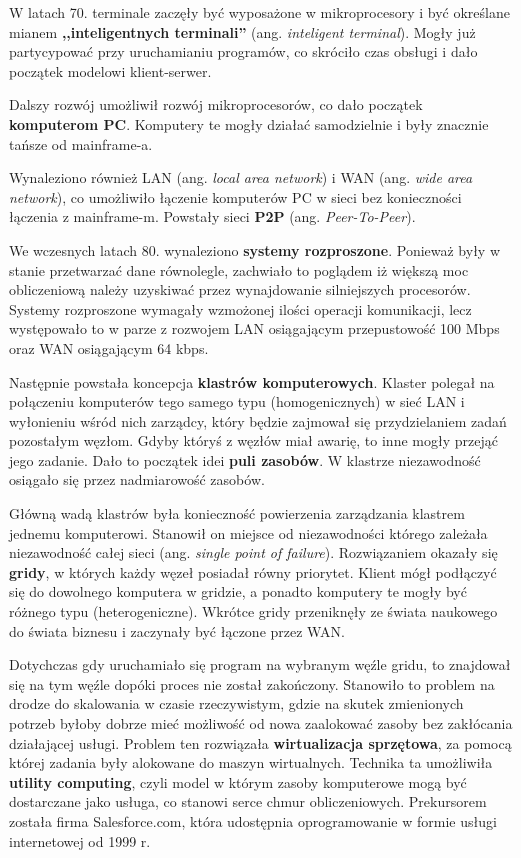 \documentclass[12pt,a4paper,twoside,titlepage,openright]{book}
\begin{document}
W latach 70. terminale zaczęły być wyposażone w mikroprocesory i być określane mianem \textbf{,,inteligentnych terminali''} (ang. \textit{inteligent terminal}). Mogły już partycypować przy uruchamianiu programów, co skróciło czas obsługi i dało początek modelowi klient-serwer.

Dalszy rozwój umożliwił rozwój mikroprocesorów, co dało początek \textbf{komputerom PC}. Komputery te mogły działać samodzielnie i były znacznie tańsze od mainframe-a.

Wynaleziono również LAN (ang. \textit{local area network}) i WAN (ang. \textit{wide area network}), co umożliwiło łączenie komputerów PC w sieci bez konieczności łączenia z mainframe-m. Powstały sieci \textbf{P2P} (ang. \textit{Peer-To-Peer}).

We wczesnych latach 80. wynaleziono \textbf{systemy rozproszone}. Ponieważ były w stanie przetwarzać dane równolegle, zachwiało to poglądem iż większą moc obliczeniową należy uzyskiwać przez wynajdowanie silniejszych procesorów. Systemy rozproszone wymagały wzmożonej ilości operacji komunikacji, lecz występowało to w parze z rozwojem LAN osiągającym przepustowość 100 Mbps oraz WAN osiągającym 64 kbps.

Następnie powstała koncepcja \textbf{klastrów komputerowych}. Klaster polegał na połączeniu komputerów tego samego typu (homogenicznych) w sieć LAN i wyłonieniu wśród nich zarządcy, który będzie zajmował się przydzielaniem zadań pozostałym węzłom. Gdyby któryś z węzłów miał awarię, to inne mogły przejąć jego zadanie. Dało to początek idei \textbf{puli zasobów}. W klastrze niezawodność osiągało się przez nadmiarowość zasobów.

Główną wadą klastrów była konieczność powierzenia zarządzania klastrem jednemu komputerowi. Stanowił on miejsce od niezawodności którego zależała niezawodność całej sieci (ang. \textit{single point of failure}). Rozwiązaniem okazały się \textbf{gridy}, w których każdy węzeł posiadał równy priorytet. Klient mógł podłączyć się do dowolnego komputera w gridzie, a ponadto komputery te mogły być różnego typu (heterogeniczne). Wkrótce gridy przeniknęły ze świata naukowego do świata biznesu i zaczynały być łączone przez WAN.

Dotychczas gdy uruchamiało się program na wybranym węźle gridu, to znajdował się na tym węźle dopóki proces nie został zakończony. Stanowiło to problem na drodze do skalowania w czasie rzeczywistym, gdzie na skutek zmienionych potrzeb byłoby dobrze mieć możliwość od nowa zaalokować zasoby bez zakłócania działającej usługi. Problem ten rozwiązała \textbf{wirtualizacja sprzętowa}, za pomocą której zadania były alokowane do maszyn wirtualnych. Technika ta umożliwiła \textbf{utility computing}, czyli model w którym zasoby komputerowe mogą być dostarczane jako usługa, co stanowi serce chmur obliczeniowych. Prekursorem została firma Salesforce.com, która udostępnia oprogramowanie w formie usługi internetowej od 1999 r.
\end{document}
